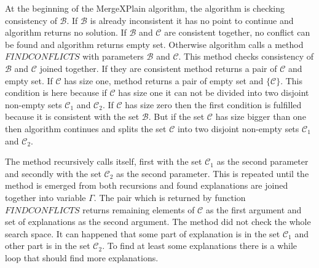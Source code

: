 \documentclass[12pt,a4paper]{article}
\begin{document}
At the beginning of the MergeXPlain algorithm, the algorithm is checking consistency of $\mathcal{B}$. If $\mathcal{B}$ is already inconsistent it has no point to continue and algorithm returns no solution. If $\mathcal{B}$ and $\mathcal{C}$ are consistent together, no conflict can be found and algorithm returns empty set. Otherwise algorithm calls a method $\mathit{FINDCONFLICTS}$ with parameters $\mathcal{B}$ and $\mathcal{C}$. This method checks consistency of $\mathcal{B}$ and $\mathcal{C}$ joined together. If they are consistent method returns a pair of $\mathcal{C}$ and empty set. If $\mathcal{C}$ has size one, method returns a pair of empty set and $\{ \mathcal{C} \}$. This condition is here because if $\mathcal{C}$ has size one it can not be divided into two disjoint non-empty sets $\mathcal{C}_{1}$ and $\mathcal{C}_{2}$. If $\mathcal{C}$ has size zero then the first condition is fulfilled because it is consistent with the set $\mathcal{B}$. But if the set $\mathcal{C}$ has size bigger than one then algorithm continues and splits the set $\mathcal{C}$ into two disjoint non-empty sets $\mathcal{C}_{1}$ and $\mathcal{C}_{2}$. 

The method recursively calls itself, first with the set $\mathcal{C}_{1}$ as the second parameter and secondly with the set $\mathcal{C}_{2}$ as the second parameter. This is repeated until the method is emerged from both recursions and found explanations are joined together into variable $\Gamma$. The pair which is returned by function $\mathit{FINDCONFLICTS}$ returns remaining elements of $\mathcal{C}$ as the first argument and set of explanations as the second argument. The method did not check the whole search space. It can happened that some part of explanation is in the set $\mathcal{C}_{1}$ and other part is in the set $\mathcal{C}_{2}$. To find at least some explanations there is a while loop that should find more explanations. 
\end{document}
